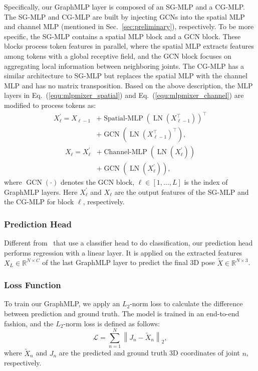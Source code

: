 \documentclass[lettersize,journal]{IEEEtran}
\begin{document}
Specifically, our GraphMLP layer is composed of an SG-MLP and a CG-MLP. 
The SG-MLP and CG-MLP are built by injecting GCNs into the spatial MLP and channel MLP (mentioned in Sec.~\ref{sec:preliminary}), respectively. 
To be more specific, the SG-MLP contains a spatial MLP block and a GCN block. 
These blocks process token features in parallel, where the spatial MLP extracts features among tokens with a global receptive field, and the GCN block focuses on aggregating local information between neighboring joints. 
The CG-MLP has a similar architecture to SG-MLP but replaces the spatial MLP with the channel MLP and has no matrix transposition. 
Based on the above description, the MLP layers in Eq.~(\ref{equ:mlpmixer_spatial}) and Eq.~(\ref{equ:mlpmixer_channel}) are modified to process tokens as:
\begin{equation}
  \begin{aligned}
    X^{\prime}_{\ell} = X_{\ell-1} &+ \operatorname{Spatial-MLP}(\operatorname{LN}(X_{\ell-1}^{\top}))^{\top} \\
    &+ \operatorname{GCN}(\operatorname{LN}({X_{\ell-1}^{\top}})^{\top}), 
  \end{aligned}
\end{equation}
\begin{equation}
  \begin{aligned}
    X_{\ell} = X^{\prime}_{\ell} &+ \operatorname{Channel-MLP}(\operatorname{LN}(X^{\prime}_{\ell})) \\
    & + \operatorname{GCN}(\operatorname{LN}({X^{\prime}_{\ell}})),
  \end{aligned}
\end{equation}
where $\operatorname{GCN}(\cdot)$ denotes the GCN block, $\ell \in [1, \ldots, L]$ is the index of GraphMLP layers. 
Here $X^{\prime}_{\ell}$ and $X_{\ell}$ are the output features of the SG-MLP and the CG-MLP for block $\ell$, respectively.  

\subsubsection{Prediction Head}
Different from~\cite{vit,mlpmixer} that use a classifier head to do classification, our prediction head performs regression with a linear layer. 
It is applied on the extracted features $X_{L} \in \mathbb{R}^{N \times C}$ of the last GraphMLP layer to predict the final 3D pose $\widetilde{X} \in \mathbb{R}^{N \times 3}$. 

\subsubsection{Loss Function}
To train our GraphMLP, we apply an $L_{2}$-norm loss to calculate the difference between prediction and ground truth. 
The model is trained in an end-to-end fashion, and the $L_{2}$-norm loss is defined as follows:
\begin{equation}
  \mathcal{L}=\sum_{n=1}^{N} \left\|J_{n}-\widetilde{X}_{n}\right\|_{2},
\end{equation}
where $\widetilde{X}_{n}$ and $J_{n}$ are the predicted and ground truth 3D coordinates of joint $n$, respectively. 
\end{document}

